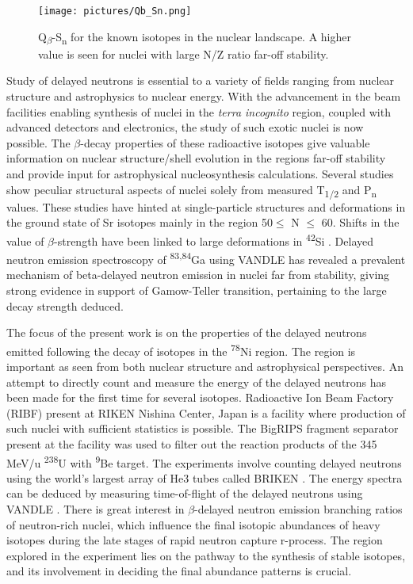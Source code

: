 \documentclass[a4paper,12pt,twoside]{report}
\begin{document}
\begin{figure}[h]
\centering
\texttt{[image: pictures/Qb\_Sn.png]}
\caption[(Q{\textsubscript{$\beta$}}-S{\textsubscript{n}} for nuclei in the chart of nuclei..]{Q{\textsubscript{$\beta$}}-S{\textsubscript{n}} for the known isotopes in the nuclear landscape. A higher value is seen for nuclei with large N/Z ratio far-off stability.}
\end{figure}

Study of delayed neutrons is essential to a variety of fields ranging from nuclear structure and astrophysics to nuclear energy. With the advancement in the beam facilities enabling synthesis of nuclei in the \textit{terra incognito} region, coupled with advanced detectors and electronics, the study of such exotic nuclei is now possible. The $\beta$-decay properties of these radioactive isotopes give valuable information on nuclear structure/shell evolution in the regions far-off stability and provide input for astrophysical nucleosynthesis calculations. Several studies show peculiar structural aspects of nuclei solely from measured T\textsubscript{1/2} and P\textsubscript{n} values. These studies have hinted at single-particle structures and deformations in the ground state of Sr isotopes mainly in the region 50$\leq$ N $\leq$ 60. Shifts in the value of $\beta$-strength have been linked to large deformations in \textsuperscript{42}Si \cite{n28}. Delayed neutron emission spectroscopy of \textsuperscript{83,84}Ga \cite{78Nimiguelmadurga} using VANDLE \cite{VANDLE} has revealed a prevalent mechanism of beta-delayed neutron emission in nuclei far from stability, giving strong evidence in support of Gamow-Teller transition, pertaining to the large decay strength deduced. 

The focus of the present work is on the properties of the delayed neutrons emitted following the decay of isotopes in the \textsuperscript{78}Ni region. The region is important as seen from both nuclear structure and astrophysical perspectives. An attempt to directly count and measure the energy of the delayed neutrons has been made for the first time for several isotopes. Radioactive Ion Beam Factory (RIBF) present at RIKEN Nishina Center, Japan is a facility where production of such nuclei with sufficient statistics is possible. The BigRIPS fragment separator present at the facility was used to filter out the reaction products of the 345 MeV/u  \textsuperscript{238}U with \textsuperscript{9}Be target. The experiments involve counting delayed neutrons using the world's largest array of He3 tubes called BRIKEN \cite{BRIKEN}. The energy spectra can be deduced by measuring time-of-flight of the delayed neutrons using VANDLE \cite{VANDLE}. There is great interest in $\beta$-delayed neutron emission branching ratios of neutron-rich nuclei, which influence the final isotopic abundances of heavy isotopes during the late stages of rapid neutron capture r-process. The region explored in the experiment lies on the pathway to the synthesis of stable isotopes, and its involvement in deciding the final abundance patterns is crucial. 
\end{document}
